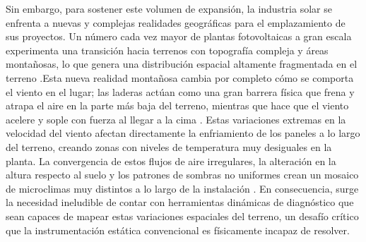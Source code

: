\documentclass[../../General.tex]{subfiles}
\begin{document}
Sin embargo, para sostener este volumen de expansión, la industria solar se enfrenta a nuevas y complejas realidades geográficas para el emplazamiento de sus proyectos. Un número cada vez mayor de plantas fotovoltaicas a gran escala experimenta una transición hacia terrenos con topografía compleja y áreas montañosas, lo que genera una distribución espacial altamente fragmentada en el terreno \citep{Mao2025}.Esta nueva realidad montañosa cambia por completo cómo se comporta el viento en el lugar; las laderas actúan como una gran barrera física que frena y atrapa el aire en la parte más baja del terreno, mientras que hace que el viento acelere y sople con fuerza al llegar a la cima \citep{Xu2024}. Estas variaciones extremas en la velocidad del viento afectan directamente la enfriamiento de los paneles a lo largo del terreno, creando zonas con niveles de temperatura muy desiguales en la planta. 
La convergencia de estos flujos de aire irregulares, la alteración en la altura respecto al suelo y los patrones de sombras no uniformes crean un mosaico de microclimas muy distintos a lo largo de la instalación \citep{Armstrong2026}. En consecuencia, surge la necesidad ineludible de contar con herramientas dinámicas de diagnóstico que sean capaces de mapear estas variaciones espaciales del terreno, un desafío crítico que la instrumentación estática convencional es físicamente incapaz de resolver.
\end{document}
